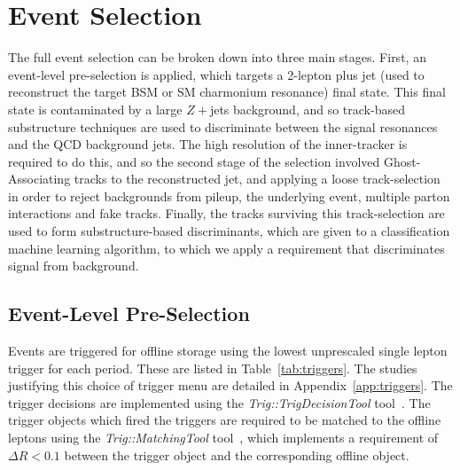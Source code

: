 \documentclass[NOTE, atlasdraft=true, texlive=2017, UKenglish]{\ATLASLATEXPATH atlasdoc}
\begin{document}
\clearpage
\section{Event Selection}
\label{sec:selection}

The full event selection can be broken down into three main stages. First, an event-level pre-selection is applied, which targets a 2-lepton plus jet (used to reconstruct the target BSM or SM charmonium resonance) final state. This final state is contaminated by a large $Z+$jets background, and so track-based substructure techniques are used to discriminate between the signal resonances and the QCD background jets. The high resolution of the inner-tracker is required to do this, and so the second stage of the selection involved Ghost-Associating tracks to the reconstructed jet, and applying a loose track-selection in order to reject backgrounds from pileup, the underlying event, multiple parton interactions and fake tracks. Finally, the tracks surviving this track-selection are used to form substructure-based discriminants, which are given to a classification machine learning algorithm, to which we apply a requirement that discriminates signal from background.

\subsection{Event-Level Pre-Selection}
\label{sec:premlpselection}

Events are triggered for offline storage using the lowest unprescaled single lepton trigger for each period. These are listed in Table~\ref{tab:triggers}. The studies justifying this choice of trigger menu are detailed in Appendix~\ref{app:triggers}. The trigger decisions are implemented using the \emph{Trig::TrigDecisionTool} tool~\cite{TrigDecisionTool}. The trigger objects which fired the triggers are required to be matched to the offline leptons using the \emph{Trig::MatchingTool} tool~\cite{MatchingTool}, which implements a requirement of $\Delta R<0.1$ between the trigger object and the corresponding offline object.
\end{document}
